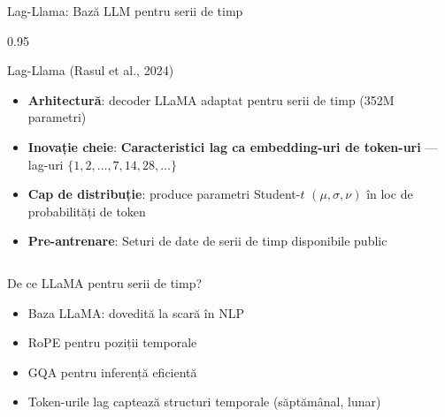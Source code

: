 \documentclass[9pt, aspectratio=169, t]{beamer}
\begin{document}
\begin{frame}{Lag-Llama: Bază LLM pentru serii de timp}
    \begin{cminipage}{0.95\textwidth}
    \vspace{-3mm}
    {\scriptsize
    \begin{block}{Lag-Llama (Rasul et al., 2024)}
        \vspace{-1mm}
        \begin{itemize}\setlength{\itemsep}{0pt}
            \item \textbf{Arhitectură}: decoder LLaMA adaptat pentru serii de timp (352M parametri)
            \item \textbf{Inovație cheie}: \textbf{Caracteristici lag ca embedding-uri de token-uri} --- lag-uri $\{1, 2, \ldots, 7, 14, 28, \ldots\}$
            \item \textbf{Cap de distribuție}: produce parametri Student-$t$ $(\mu, \sigma, \nu)$ în loc de probabilități de token
            \item \textbf{Pre-antrenare}: Seturi de date de serii de timp disponibile public
        \end{itemize}
        \vspace{-1mm}
    \end{block}
    \vspace{-3mm}
    \begin{columns}[T]
        \begin{exampleblock}{De ce LLaMA pentru serii de timp?}
            \begin{itemize}\setlength{\itemsep}{0pt}
                \item Baza LLaMA: dovedită la scară în NLP
                \item RoPE pentru poziții temporale
                \item GQA pentru inferență eficientă
                \item Token-urile lag captează structuri temporale (săptămânal, lunar)
            \end{itemize}
        \end{exampleblock}


\end{columns}}
\end{cminipage}
\end{frame}
\end{document}
